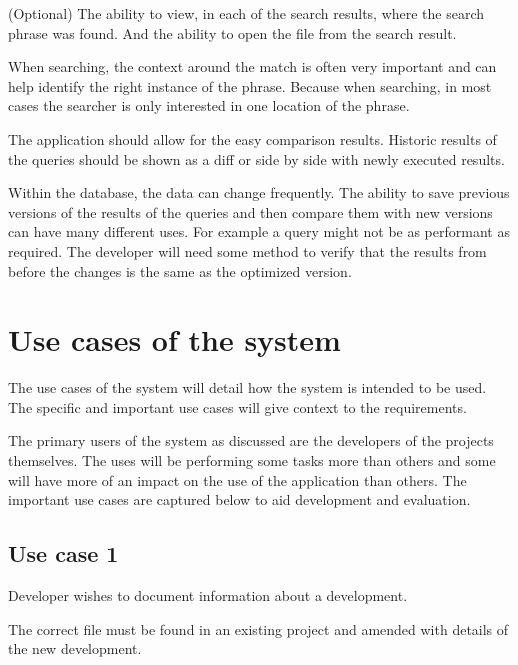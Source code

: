 \begin{requirement}{(Optional)}
The ability to view, in each of the search results, where the search phrase was found. And the ability to open the file from the search result.

When searching, the context around the match is often very important and can help identify the right instance of the phrase. Because when searching, in most cases the searcher is only interested in one location of the phrase.
\end{requirement}

\begin{requirement}
The application should allow for the easy comparison results. Historic results of the queries should be shown as a diff or side by side with newly executed results.

Within the database, the data can change frequently. The ability to save previous versions of the results of the queries and then compare them with new versions can have many different uses. For example a query might not be as performant as required. The developer will need some method to verify that the results from before the changes is the same as the optimized version.
\end{requirement}

\section{Use cases of the system}\label{use-cases-of-the-system}

The use cases of the system will detail how the system is intended to be used. The specific and important use cases will give context to the requirements.

The primary users of the system as discussed are the developers of the projects
themselves. The uses will be performing some tasks more than others and some will have more of an impact on the use of the application than others. The important use cases are captured below to aid development and evaluation.

\subsection{Use case 1}\label{use-case-1}

Developer wishes to document information about a development.

The correct file must be found in an existing project and amended with details of the new development.

